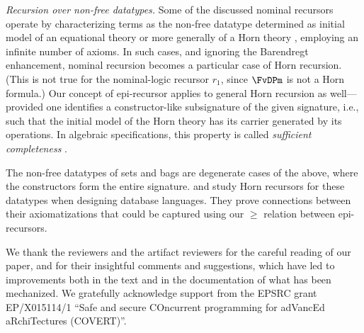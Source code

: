 \smallskip
\textit{Recursion over non-free datatypes.} 
Some of the discussed 
nominal recursors operate by characterizing terms as the non-free datatype determined as %
initial model of an equational theory \cite{BurrisSankappanavar1981} %
or more generally of a Horn theory \cite{DBLP:journals/jcss/Makowsky87}, employing an infinite number of axioms. In such cases, and ignoring the Barendregt enhancement, nominal recursion 
becomes a particular case of 
Horn recursion. (This %
is not true for the nominal-logic recursor $r_1$, since 
$\FvDPm$ %
is not a Horn formula.)   
%
Our concept of epi-recursor %
applies to general Horn recursion as well---provided one identifies a constructor-like  subsignature of the given signature, i.e., %
such that the 
initial model of the Horn theory has its carrier generated by its operations. In %
algebraic specifications, this property is called \emph{sufficient completeness} \cite{DBLP:journals/acta/GuttagH78}. 
%

The non-free datatypes of sets and bags are degenerate %
cases of the above, where the constructors %
form the entire signature. 
\citet{DBLP:conf/icalp/TannenS91}  
and %
\citet{DBLP:journals/tcs/BunemanNTW95} 
study %
Horn recursors for these datatypes  
when designing database languages. 
They prove connections %
between their %
axiomatizations that could be captured %
using our $\geq$ relation between epi-recursors. 




\begin{acks}
	We thank the reviewers and the artifact reviewers for the careful reading of our paper, and for their insightful comments and suggestions, which have led to improvements both in the text and in the documentation of what has been mechanized.  
	We gratefully acknowledge support from the EPSRC grant EP/X015114/1 ``Safe and secure COncurrent programming for adVancEd aRchiTectures (COVERT)''. 
\end{acks} 





